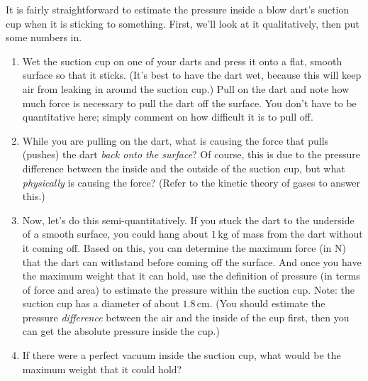 \begin{exercise} 
  It is fairly straightforward to estimate the pressure inside a blow
  dart's suction cup when it is sticking to something.  First, we'll
  look at it qualitatively, then put some numbers in.
  \begin{enumerate}
  \item Wet the suction cup on one of your darts and press it onto a
    flat, smooth surface so that it sticks.  (It's best to have the
    dart wet, because this will keep air from leaking in around the
    suction cup.)  Pull on the dart and note how much force is
    necessary to pull the dart off the surface.  You don't have to be
    quantitative here; simply comment on how difficult it is to pull
    off.

  \item While you are pulling on the dart, what is causing the force
    that pulls (pushes) the dart \emph{back onto the surface}?  Of
    course, this is due to the pressure difference between the inside
    and the outside of the suction cup, but what \emph{physically} is
    causing the force?  (Refer to the kinetic theory of gases to
    answer this.)

  \item Now, let's do this semi-quantitatively.  If you stuck the dart
    to the underside of a smooth surface, you could hang about $1\,
    \mbox{kg}$ of mass from the dart without it coming off.  Based on
    this, you can determine the maximum force (in N) that the dart can
    withstand before coming off the surface.  And once you have the
    maximum weight that it can hold, use the definition of pressure
    (in terms of force and area) to estimate the pressure within the
    suction cup.  Note: the suction cup has a diameter of about $1.8\,
    \mbox{cm}$.  (You should estimate the pressure \emph{difference}
    between the air and the inside of the cup first, then you can get
    the absolute pressure inside the cup.)

  \item If there were a perfect vacuum inside the suction cup, what
    would be the maximum weight that it could hold?
  \end{enumerate}
\end{exercise}



